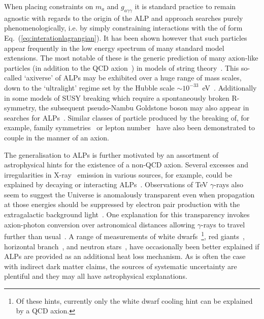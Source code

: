 When placing constraints on $m_a$ and $g_{a\gamma\gamma}$ it is standard practice to remain agnostic with regards to the origin of the ALP and approach searches purely phenomenologically, i.e. by simply constraining interactions with the of form Eq.~(\ref{eq:interationlagrangian}). It has been shown however that such particles appear frequently in the low energy spectrum of many standard model extensions. The most notable of these is the generic prediction of many axion-like particles (in addition to the QCD axion~\cite{Cicoli:2012sz}) in models of string theory~\cite{Svrcek:2006yi}. This so-called `axiverse' of ALPs may be exhibited over a huge range of mass scales, down to the `ultralight' regime set by the Hubble scale $\sim10^{-33}$~eV~\cite{Arvanitaki:2009fg}. Additionally in some models of SUSY breaking which require a spontaneously broken R-symmetry, the subsequent pseudo-Nambu Goldstone boson may also appear in searches for ALPs~\cite{Nelson:1993nf}. Similar classes of particle produced by the breaking of, for example, family symmetries~\cite{Jaeckel:2013uva} or lepton number~\cite{Chikashige:1980ui} have also been demonstrated to couple in the manner of an axion.

The generalisation to ALPs is further motivated by an assortment of astrophysical hints for the existence of a non-QCD axion. Several excesses and irregularities in X-ray~\cite{Bulbul:2014sua,Boyarsky:2014jta,Berg:2016ese} emission in various sources, for example, could be explained by decaying or interacting ALPs~\cite{Conlon:2013txa,Conlon:2014wna}. Observations of TeV $\gamma$-rays also seem to suggest the Universe is anomalously transparent even when propagation at those energies should be suppressed by electron pair production with the extragalactic background light~\cite{Aharonian:2005gh,Mazin:2007pn,Aliu:2008ay,Ackermann:2012sza,Abramowski:2012ry}. One explanation for this transparency invokes axion-photon conversion over astronomical distances allowing $\gamma$-rays to travel further than usual~\cite{DeAngelis:2011id,Wang:2015dil}. A range of measurements of  white dwarfs~\cite{Isern:2008nt}\footnote{Of these hints, currently only the white dwarf cooling hint can be explained by a QCD axion.}, red giants~\cite{Viaux:2013lha}, horizontal branch~\cite{Ayala:2014pea}, and neutron stars~\cite{Leinson:2014ioa}, have occasionally been better explained if ALPs are provided as an additional heat loss mechanism. As is often the case with indirect dark matter claims, the sources of systematic uncertainty are plentiful and they may all have astrophysical explanations.

